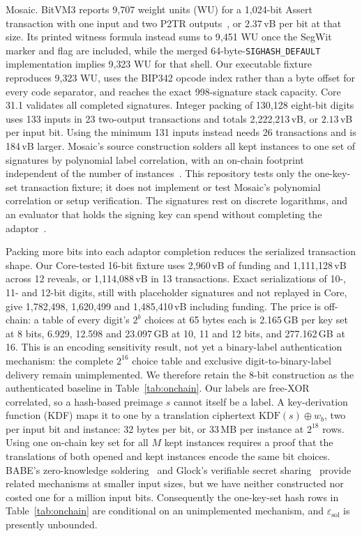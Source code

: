 \documentclass[11pt]{article}
\begin{document}
\begin{itemize}
    Mosaic. BitVM3 reports 9{,}707 weight units (WU) for a 1{,}024-bit Assert
    transaction with one input and two P2TR outputs~\cite{bitvm3paper}, or
    $2.37$\,vB per bit at that size. Its printed witness formula instead sums to
    9{,}451 WU once the SegWit marker and flag are included, while the merged
    64-byte-\texttt{SIGHASH\_DEFAULT} implementation implies 9{,}323 WU for
    that shell. Our executable fixture reproduces 9{,}323 WU, uses the BIP342
    opcode index rather than a byte offset for every code separator, and reaches
    the exact 998-signature stack capacity. Core 31.1 validates all completed
    signatures. Integer packing of 130{,}128 eight-bit digits uses 133
    inputs in 23 two-output transactions and totals 2{,}222{,}213\,vB, or
    $2.13$\,vB per input bit. Using the minimum 131 inputs instead needs 26
    transactions and is 184\,vB larger. Mosaic's source construction solders all
    kept instances to one set of signatures by polynomial label correlation,
    with an on-chain footprint independent of the number of
    instances~\cite{mosaic26}. This repository tests only the one-key-set
    transaction fixture; it does not implement or test Mosaic's polynomial
    correlation or setup verification. The signatures rest on
    discrete logarithms, and an evaluator that holds the signing key can spend
    without completing the adaptor~\cite{antichain26}.
\end{itemize}
Packing more bits into each adaptor completion reduces the serialized
transaction shape. Our Core-tested 16-bit fixture uses 2{,}960\,vB of funding
and 1{,}111{,}128\,vB across 12 reveals, or 1{,}114{,}088\,vB in 13
transactions. Exact serializations of 10-, 11- and 12-bit digits, still
with placeholder signatures and not replayed in Core, give 1{,}782{,}498,
1{,}620{,}499 and 1{,}485{,}410\,vB including funding. The price is off-chain:
a table of every digit's $2^{b}$ choices at 65 bytes each is 2.165\,GB per key
set at 8 bits, 6.929, 12.598 and 23.097\,GB at 10, 11 and 12 bits, and
277.162\,GB at 16. This is an encoding sensitivity result, not yet a
binary-label authentication mechanism: the complete $2^{16}$ choice table and
exclusive digit-to-binary-label delivery remain unimplemented. We therefore retain the
8-bit construction as the authenticated baseline in Table~\ref{tab:onchain}.
Our labels are free-XOR correlated, so a hash-based preimage $s$ cannot itself be
a label. A key-derivation function (KDF) maps it to one by a translation ciphertext
$\mathrm{KDF}(s)\oplus w_b$, two per input bit and instance: 32 bytes per bit,
or 33\,MB per instance at $2^{18}$ rows. Using one on-chain key set for all $M$
kept instances requires a proof that the translations of both opened and kept
instances encode the same bit choices. BABE's zero-knowledge
soldering~\cite{babe2026} and Glock's verifiable secret
sharing~\cite{eag25glock} provide related mechanisms at smaller input sizes,
but we have neither constructed nor costed one for a million input bits.
Consequently the one-key-set hash rows in Table~\ref{tab:onchain} are
conditional on an unimplemented mechanism, and
$\varepsilon_{\mathrm{sol}}$ is presently unbounded.
\end{document}
